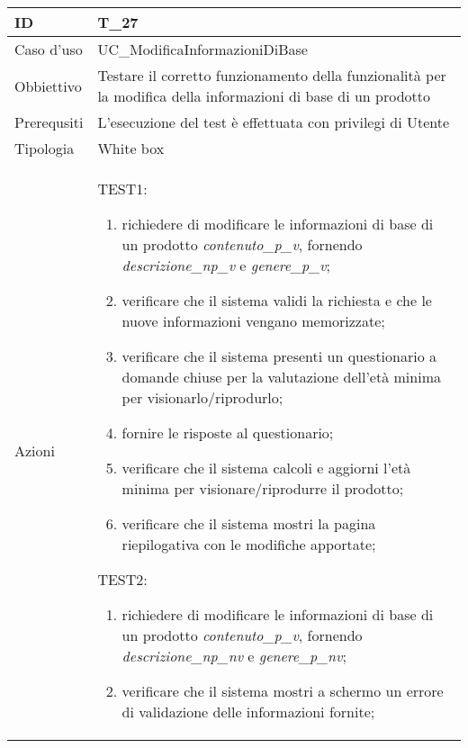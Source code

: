 \begin{table}[hb]
    \centering
    \begin{tabular}{ |p{2cm}|p{10cm}|  }
        \hline
        ID          & T\_27                                                                      \\\hline
        Caso d'uso  & UC\_ModificaInformazioniDiBase                                                      \\\hline
        Obbiettivo  & Testare il corretto funzionamento della funzionalità per la modifica della informazioni di base di un prodotto  \\\hline
        Prerequsiti & L'esecuzione del test è effettuata con privilegi di Utente                 \\\hline
        Tipologia   & White box                                                                  \\\hline
        Azioni      &
        TEST1:
        \begin{enumerate}[nosep, topsep=0pt]
            \item richiedere di modificare le informazioni di base di un prodotto \emph{contenuto\_p\_v}, fornendo \emph{descrizione\_np\_v} e \emph{genere\_p\_v};
            \item verificare che il sistema validi la richiesta e che le nuove informazioni vengano memorizzate;
            \item verificare che il sistema presenti un questionario a domande chiuse per la valutazione dell'età minima per visionarlo/riprodurlo;
            \item fornire le risposte al questionario;
            \item verificare che il sistema calcoli e aggiorni l'età minima per visionare/riprodurre il prodotto;
            \item verificare che il sistema mostri la pagina riepilogativa con le modifiche apportate;
        \end{enumerate}
        \vspace{0.5cm} TEST2:
        \begin{enumerate}[nosep, topsep=0pt]
            \item richiedere di modificare le informazioni di base di un prodotto \emph{contenuto\_p\_v}, fornendo \emph{descrizione\_np\_nv} e \emph{genere\_p\_nv};
            \item verificare che il sistema mostri a schermo un errore di validazione delle informazioni fornite;
        \end{enumerate}
        \\\hline
    \end{tabular}
\end{table}
